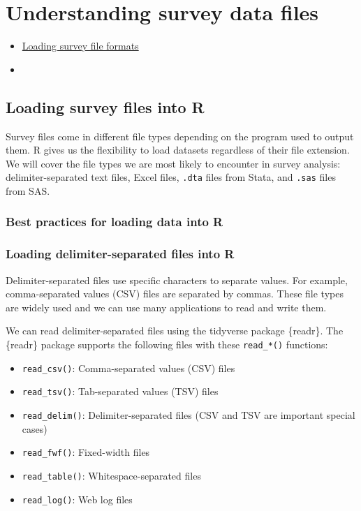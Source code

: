 \documentclass[
]{krantz}
\providecommand{\tightlist}{%
  \setlength{\itemsep}{0pt}\setlength{\parskip}{0pt}}
\begin{document}
\hypertarget{c03}{%
\chapter{Understanding survey data files}\label{c03}}

\begin{itemize}
\tightlist
\item
  \protect\hyperlink{loading-survey-file-formats}{Loading survey file formats}
\item
\end{itemize}

\hypertarget{loading-survey-files-into-r}{%
\section{Loading survey files into R}\label{loading-survey-files-into-r}}

Survey files come in different file types depending on the program used to output them. R gives us the flexibility to load datasets regardless of their file extension. We will cover the file types we are most likely to encounter in survey analysis: delimiter-separated text files, Excel files, \texttt{.dta} files from Stata, and \texttt{.sas} files from SAS.

\hypertarget{best-practices-for-loading-data-into-r}{%
\subsection{Best practices for loading data into R}\label{best-practices-for-loading-data-into-r}}

\hypertarget{loading-delimiter-separated-files-into-r}{%
\subsection{Loading delimiter-separated files into R}\label{loading-delimiter-separated-files-into-r}}

Delimiter-separated files use specific characters to separate values. For example, comma-separated values (CSV) files are separated by commas. These file types are widely used and we can use many applications to read and write them.

We can read delimiter-separated files using the tidyverse package \{readr\}. The \{readr\} package supports the following files with these \texttt{read\_*()} functions:

\begin{itemize}
\tightlist
\item
  \texttt{read\_csv()}: Comma-separated values (CSV) files
\item
  \texttt{read\_tsv()}: Tab-separated values (TSV) files
\item
  \texttt{read\_delim()}: Delimiter-separated files (CSV and TSV are important special cases)
\item
  \texttt{read\_fwf()}: Fixed-width files
\item
  \texttt{read\_table()}: Whitespace-separated files
\item
  \texttt{read\_log()}: Web log files
\end{itemize}
\end{document}
